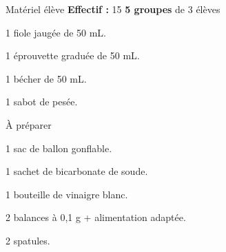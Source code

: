 
\begin{boiteMateriel}{Matériel élève}
  \textbf{Effectif :} 15
  \qq{}\qq{}
  \flecheLongue \textbf{5 groupes} de 3 élèves
  
  \begin{protocole}
    \item 1 fiole jaugée de 50 mL.
    \item 1 éprouvette graduée de 50 mL.
    \item 1 bécher de 50 mL.
    \item 1 sabot de pesée.
  \end{protocole}
\end{boiteMateriel}


\begin{boiteMateriel}{À préparer}
  \begin{protocole}
    \item 1 sac de ballon gonflable.
    \item 1 sachet de bicarbonate de soude.
    \item 1 bouteille de vinaigre blanc.
    \item 2 balances à 0,1 g + alimentation adaptée.
    \item 2 spatules.
  \end{protocole}
\end{boiteMateriel}